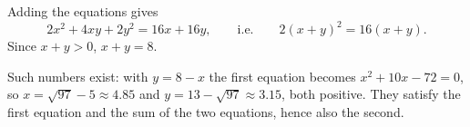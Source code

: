 Adding the equations gives
\[2x^2+4xy+2y^2=16x+16y,\qquad\text{i.e.}\qquad2(x+y)^2=16(x+y).\]
Since $x+y>0$, $x+y=\boxed{8}$.

Such numbers exist: with $y=8-x$ the first equation becomes $x^2+10x-72=0$, so $x=\sqrt{97}-5\approx4.85$ and $y=13-\sqrt{97}\approx3.15$, both positive. They satisfy the first equation and the sum of the two equations, hence also the second.
